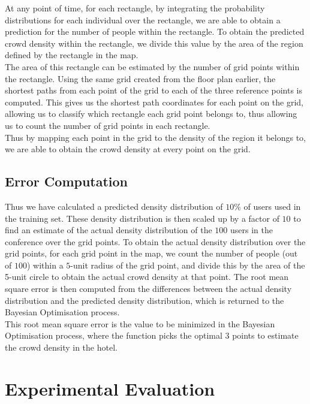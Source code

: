 \documentclass[letterpaper]{article}
\begin{document}
At any point of time, for each rectangle, by integrating the probability distributions for each individual over the rectangle, we are able to obtain a prediction for the number of people within the rectangle. To obtain the predicted crowd density within the rectangle, we divide this value by the area of the region defined by the rectangle in the map.\\

The area of this rectangle can be estimated by the number of grid points within the rectangle. Using the same grid created from the floor plan earlier, the shortest paths from each point of the grid to each of the three reference points is computed. This gives us the shortest path coordinates for each point on the grid, allowing us to classify which rectangle each grid point belongs to, thus allowing us to count the number of grid points in each rectangle. \\

Thus by mapping each point in the grid to the density of the region it belongs to, we are able to obtain the crowd density at every point on the grid.

\subsection{Error Computation}

Thus we have calculated a predicted density distribution of $10\%$ of users used in the training set. These density distribution is then scaled up by a factor of $10$ to find an estimate of the actual density distribution of the $100$ users in the conference over the grid points. To obtain the actual density distribution over the grid points, for each grid point in the map, we count the number of people (out of $100$) within a $5$-unit radius of the grid point, and divide this by the area of the 5-unit circle to obtain the actual crowd density at that point. The root mean square error is then computed from the differences between the actual density distribution and the predicted density distribution, which is returned to the Bayesian Optimisation process. \\

This root mean square error is the value to be minimized in the Bayesian Optimisation process, where the function picks the optimal 3 points to estimate the crowd density in the hotel.


\section{Experimental Evaluation}
\end{document}
